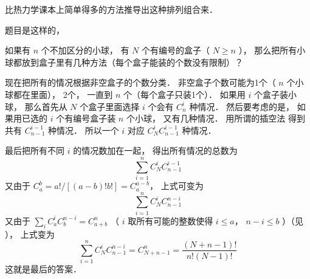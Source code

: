 
比热力学课本上简单得多的方法推导出这种排列组合来．

题目是这样的， 

如果有 $n$ 个不加区分的小球， 有 $N$ 个有编号的盒子（ $N \geqslant n$ ）， 那么把所有小球都放到盒子里有几种方法（每个盒子能装的个数没有限制）？

现在把所有的情况根据非空盒子的个数分类． 非空盒子个数可能为1个（ $n$ 个小球都在里面）， 2个， 一直到 $n$ 个（每个盒子只装1个）． 如果用 $i$ 个盒子装小球， 那么首先从 $N$ 个盒子里面选择 $i$ 个会有 $C_n^i$ 种情况． 然后要考虑的是， 如果用已选的 $i$ 个有编号盒子装 $n$ 个小球， 又有几种情况． 用所谓的插空法%
得到共有 $C_{n-1}^{i-1}$ 种情况． 所以一个 $i$ 对应 $C_N^i C_{n-1}^{i-1}$ 种情况．

最后把所有不同 $i$ 的情况数加在一起， 得出所有情况的总数为
\begin{equation}
\sum_{i = 1}^n C_N^i C_{n-1}^{i-1}
\end{equation}
又由于 $C_a^b = a!/[(a-b)!b!] = C_a^{a-b}$， 上式可变为
\begin{equation}
\sum_{i=1}^n  C_N^i C_{n-1}^{n-i}
\end{equation}
又由于 $\sum_i C_a^i C_b^{n-i} = C_{a+b}^n$ （ $i$ 取所有可能的整数使得 $i \leqslant a$，  $n - i \leqslant b$  ）（见%
）， 上式变为
\begin{equation}
\sum_{i=1}^n C_N^i C_{n-1}^{n-i} = C_{N+n-1}^n = \frac{(N+n-1)!}{n!(N - 1)!}
\end{equation}
这就是最后的答案．

